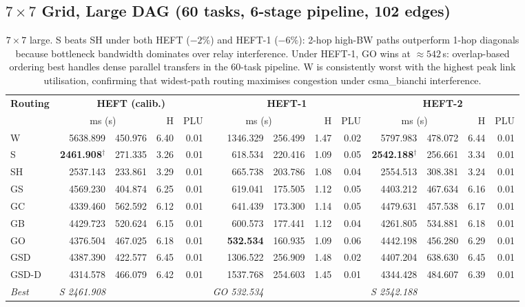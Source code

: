 \documentclass[11pt]{article}
\newcommand{\win}[1]{\textcolor{green!50!black}{\textbf{#1}}}
\newcommand{\bad}[1]{\textcolor{red!70!black}{#1}}
\begin{document}
\subsection{$7\times7$ Grid, Large DAG (60 tasks, 6-stage pipeline, 102 edges)}

\begin{table}[H]
\centering
\small
\setlength{\tabcolsep}{4pt}
\begin{tabular}{l r@{$\,\pm\,$}l r r r@{$\,\pm\,$}l r r r@{$\,\pm\,$}l r r}
\toprule
\textbf{Routing} & \multicolumn{4}{c}{\textbf{HEFT (calib.)}} & \multicolumn{4}{c}{\textbf{HEFT-1}} & \multicolumn{4}{c}{\textbf{HEFT-2}} \\
\cmidrule(lr){2-5}\cmidrule(lr){6-9}\cmidrule(lr){10-13}
 & \multicolumn{2}{c}{ms (s)} & H & PLU & \multicolumn{2}{c}{ms (s)} & H & PLU & \multicolumn{2}{c}{ms (s)} & H & PLU \\
\midrule
W & \bad{5638.899} & 450.976 & 6.40 & 0.01 & 1346.329 & 256.499 & 1.47 & 0.02 & \bad{5797.983} & 478.072 & 6.44 & 0.01 \\
S & \textbf{2461.908}$^\dagger$ & 271.335 & 3.26 & 0.01 & 618.534 & 220.416 & 1.09 & 0.05 & \textbf{2542.188}$^\dagger$ & 256.661 & 3.34 & 0.01 \\
SH & 2537.143 & 233.861 & 3.29 & 0.01 & 665.738 & 203.786 & 1.08 & 0.04 & 2554.513 & 308.381 & 3.24 & 0.01 \\
GS & 4569.230 & 404.874 & 6.25 & 0.01 & 619.041 & 175.505 & 1.12 & 0.05 & 4403.212 & 467.634 & 6.16 & 0.01 \\
GC & 4339.460 & 562.592 & 6.12 & 0.01 & 641.439 & 173.300 & 1.14 & 0.05 & 4479.631 & 457.538 & 6.17 & 0.01 \\
GB & 4429.723 & 520.624 & 6.15 & 0.01 & 600.573 & 177.441 & 1.12 & 0.04 & 4261.805 & 534.881 & 6.18 & 0.01 \\
GO & 4376.504 & 467.025 & 6.18 & 0.01 & \win{532.534} & 160.935 & 1.09 & 0.06 & 4442.198 & 456.280 & 6.29 & 0.01 \\
GSD & 4387.390 & 422.577 & 6.45 & 0.01 & 1306.522 & 256.909 & 1.48 & 0.02 & 4407.204 & 638.630 & 6.45 & 0.01 \\
GSD\mbox{-}D & 4314.578 & 466.079 & 6.42 & 0.01 & \bad{1537.768} & 254.603 & 1.45 & 0.01 & 4344.428 & 484.607 & 6.39 & 0.01 \\
\midrule
\textit{Best} & \textit{S 2461.908} &  &  &  & \textit{GO 532.534} &  &  &  & \textit{S 2542.188} &  &  &  \\
\bottomrule
\end{tabular}
\caption{$7\times7$ large. S beats SH under both HEFT ($-2\%$) and HEFT-1 ($-6\%$): 2-hop high-BW paths outperform 1-hop diagonals because bottleneck bandwidth dominates over relay interference. Under HEFT-1, GO wins at $\approx542$\,s: overlap-based ordering best handles dense parallel transfers in the 60-task pipeline. W is consistently worst with the highest peak link utilisation, confirming that widest-path routing maximises congestion under csma\_bianchi interference.}
\end{table}
\end{document}
